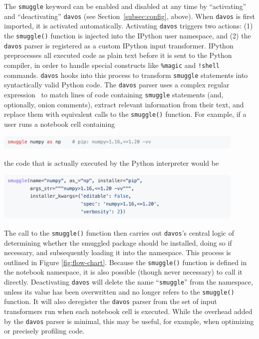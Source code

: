 \documentclass[preprint,12pt,a4paper]{elsarticle}
\begin{document}
The \texttt{smuggle} keyword can be enabled and disabled at any time by ``activating'' and ``deactivating'' \texttt{davos} (see Section~\ref{subsec:config}, above). When \texttt{davos} is first imported, it is activated automatically. Activating \texttt{davos} triggers two actions: (1) the \texttt{smuggle()} function is injected into the IPython user namespace, and (2) the \texttt{davos} parser is registered as a custom IPython input transformer. IPython preprocesses all executed code as plain text before it is sent to the Python compiler, in order to handle special constructs like \texttt{\%magic} and \texttt{!shell} commands. \texttt{davos} hooks into this process to transform \texttt{smuggle} statements into syntactically valid Python code. The \texttt{davos} parser uses a complex regular expression~\cite{Thom68} to match lines of code containing \texttt{smuggle} statements (and, optionally, onion comments), extract relevant information from their text, and replace them with equivalent calls to the \texttt{smuggle()} function. For example, if a user runs a notebook cell containing
\begin{center}
\includegraphics[width=0.9\textwidth]{figs/snippet6}
\end{center}
the code that is actually executed by the Python interpreter would be
\begin{center}
\includegraphics[width=0.9\textwidth]{figs/snippet7}
\end{center}
The call to the \texttt{smuggle()} function then carries out \texttt{davos}'s central logic of determining whether the smuggled package should be installed, doing so if necessary, and subsequently loading it into the namespace. This process is outlined in Figure \ref{fig:flow-chart}. Because the \texttt{smuggle()} function is defined in the notebook namespace, it is also possible (though never necessary) to call it directly. Deactivating \texttt{davos} will delete the name ``\texttt{smuggle}'' from the namespace, unless its value has been overwritten and no longer refers to the \texttt{smuggle()} function. It will also deregister the \texttt{davos} parser from the set of input transformers run when each notebook cell is executed. While the overhead added by the \texttt{davos} parser is minimal, this may be useful, for example, when optimizing or precisely profiling code.
\end{document}
